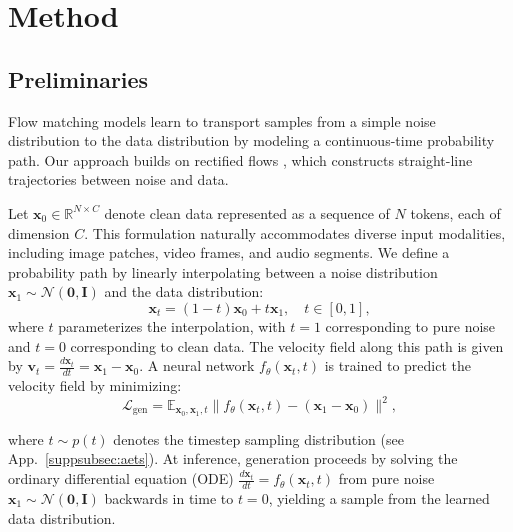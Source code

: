 \section{Method}
\label{sec:method}

    \subsection{Preliminaries}
    \label{sec:preliminaries}
    Flow matching models learn to transport samples from a simple noise distribution to the data distribution by modeling a continuous-time probability path. Our approach builds on rectified flows \citep{liu2022flow, albergo2023buildingnormalizingflowsstochastic, fmgen}, which constructs straight-line trajectories between noise and data.%

    Let $\mathbf{x}_0 \in \mathbb{R}^{N \times C}$ denote clean data represented as a sequence of $N$ tokens, each of dimension $C$. This formulation naturally accommodates diverse input modalities, including
    image patches, video frames, and audio segments. We define a probability path by linearly interpolating between a noise distribution $\mathbf{x}_1 \sim \mathcal{N}(\mathbf{0}, \mathbf{I})$ and the data
    distribution:
    \begin{equation}
    \mathbf{x}_t = (1-t)\mathbf{x}_0 + t\mathbf{x}_1, \quad t \in [0, 1],
    \end{equation}
    where $t$ parameterizes the interpolation, with $t=1$ corresponding to pure noise and $t=0$ corresponding to clean data. The velocity field along this path is given by
    $\mathbf{v}_t = \frac{d\mathbf{x}_t}{dt} = \mathbf{x}_1 - \mathbf{x}_0.$
    A neural network $f_\theta(\mathbf{x}_t, t)$ is trained to predict the velocity field by minimizing:
    \begin{equation}
    \label{eq:flowloss}
    \mathcal{L}_{\text{gen}} = \mathbb{E}_{\mathbf{x}_0, \mathbf{x}_1, t} \| f_\theta(\mathbf{x}_t, t) - (\mathbf{x}_1 - \mathbf{x}_0) \|^2,
    \end{equation}

    where $t \sim p(t)$ denotes the timestep sampling distribution (see App.~\ref{suppsubsec:aets}). At inference, generation proceeds by solving the ordinary differential equation (ODE) $\frac{d\mathbf{x}_t}{dt} =
    f_\theta(\mathbf{x}_t, t)$ from pure noise $\mathbf{x}_1 \sim \mathcal{N}(\mathbf{0}, \mathbf{I})$ backwards in time to $t=0$, yielding a sample from the learned data distribution.

